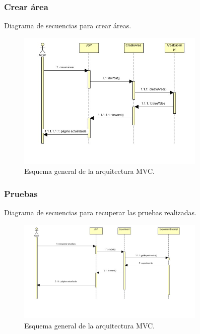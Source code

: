 \subsubsection{Crear área}
Diagrama de secuencias para crear áreas.
\begin{figure}[!htbp]
  \centering
    \includegraphics[width=0.8\textwidth]{../img/diagramas/secuencias/6.jpg}
  \caption{Esquema general de la arquitectura MVC.}
  \label{mvc}
\end{figure}

\subsubsection{Pruebas}
Diagrama de secuencias para recuperar las pruebas realizadas.
\begin{figure}[!htbp]
  \centering
    \includegraphics[width=0.8\textwidth]{../img/diagramas/secuencias/11.jpg}
  \caption{Esquema general de la arquitectura MVC.}
  \label{mvc}
\end{figure}


